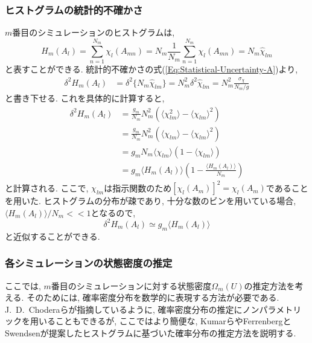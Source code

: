\subsubsection{ヒストグラムの統計的不確かさ}
$m$番目のシミュレーションのヒストグラムは, 
\begin{equation}
    H_{m}(A_{l}) =
    \sum_{n=1}^{N_m} \chi_{l}(A_{mn}) =
    N_{m} \frac{1}{N_{m}} \sum_{n=1}^{N_m} \chi_{l}(A_{mn}) =
    N_{m} \hat{\chi}_{lm}
\end{equation}
と表すことができる. 統計的不確かさの式(\ref{Eq:Statistical-Uncertainty-A})より, 
\begin{align}
    \delta^{2} H_{m}(A_{l}) &=
    \delta^{2} \{N_{m} \hat{\chi}_{lm}\} =
    N_{m}^{2} \delta^{2} \hat{\chi}_{lm} =
    N_{m}^{2} \frac{\sigma_{\chi}}{N_{m}/g}
\end{align}
と書き下せる. これを具体的に計算すると, 
\begin{align}
    \delta^{2} H_{m}(A_{l}) &=
    \frac{g_{m}}{N_{m}} N_{m}^{2}
    \left(
        \langle \chi_{lm}^{2} \rangle - \langle \chi_{lm} \rangle^{2}
    \right)
    \\ &=
    \frac{g_{m}}{N_{m}} N_{m}^{2}
    \left(
        \langle \chi_{lm} \rangle - \langle \chi_{lm} \rangle^{2}
    \right)
    \\ &=
    g_{m} N_{m} \langle \chi_{lm} \rangle
    \left(1 - \langle \chi_{lm} \rangle \right)
    \\ &=
    g_{m} \langle H_{m}(A_{l}) \rangle
    \left(1 - \frac{\langle H_{m}(A_{l}) \rangle}{N_{m}} \right)
\end{align}
と計算される. 
ここで, $\chi_{lm}$は指示関数のため$\left[\chi_{l}(A_{m})\right]^{2} = \chi_{l}(A_{m})$であることを用いた. ヒストグラムの分布が疎であり, 十分な数のビンを用いている場合, $\langle H_{m}(A_{l})\rangle/N_{m} << 1$となるので, 
\begin{equation}
    \delta^{2} H_{m}(A_{l}) \simeq g_{m} \langle H_{m}(A_{l}) \rangle
    \label{Eq:Statistical-Uncertainty-Histogram}
\end{equation}
と近似することができる. 


\subsubsection{各シミュレーションの状態密度の推定}
ここでは, $m$番目のシミュレーションに対する状態密度$\Omega_{m}(U)$の推定方法を考える. 
そのためには, 確率密度分布を数学的に表現する方法が必要である. 
J.~D.~Choderaら\cite{Chodera2007}が指摘しているように, 確率密度分布の推定にノンパラメトリックを用いることもできるが, 
ここではより簡便な, Kumar\cite{Kumar1992}らやFerrenbergとSwendsen\cite{Ferrenberg1989b}が提案したヒストグラムに基づいた確率分布の推定方法を説明する. 

